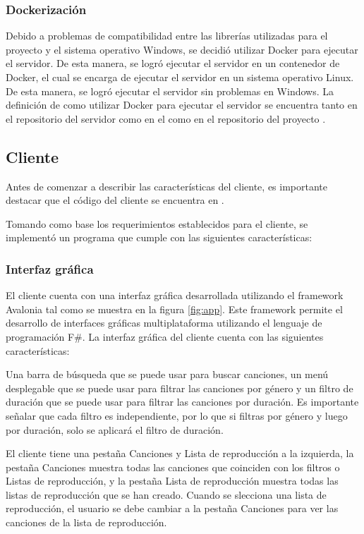 \subsubsection{Dockerización}

Debido a problemas de compatibilidad entre las librerías utilizadas para el
proyecto y el sistema operativo Windows, se decidió utilizar Docker para
ejecutar el servidor. De esta manera, se logró ejecutar el servidor en un
contenedor de Docker, el cual se encarga de ejecutar el servidor en un sistema
operativo Linux. De esta manera, se logró ejecutar el servidor sin problemas
en Windows. La definición de como utilizar Docker para ejecutar el servidor
se encuentra tanto en el repositorio del servidor \cite{server} como en el
como en el repositorio del proyecto \cite{project}.

\subsection{Cliente}

Antes de comenzar a describir las características del cliente, es importante
destacar que el código del cliente se encuentra en \cite{client}.

Tomando como base los requerimientos establecidos para el cliente, se
implementó un programa que cumple con las siguientes características:

\subsubsection{Interfaz gráfica}

El cliente cuenta con una interfaz gráfica desarrollada utilizando el framework
Avalonia tal como se muestra en la figura \ref{fig:app}. Este framework permite
el desarrollo de interfaces gráficas multiplataforma utilizando el lenguaje de
programación F\#. La interfaz gráfica del cliente cuenta con las siguientes
características:

Una barra de búsqueda que se puede usar para buscar canciones, un menú
desplegable que se puede usar para filtrar las canciones por género y un filtro
de duración que se puede usar para filtrar las canciones por duración. Es
importante señalar que cada filtro es independiente, por lo que si filtras por
género y luego por duración, solo se aplicará el filtro de duración.

El cliente tiene una pestaña Canciones y Lista de reproducción a la izquierda,
la pestaña Canciones muestra todas las canciones que coinciden con los filtros o
Listas de reproducción, y la pestaña Lista de reproducción muestra todas las
listas de reproducción que se han creado. Cuando se slecciona una lista de
reproducción, el usuario se debe cambiar a la pestaña Canciones para ver las
canciones de la lista de reproducción.

